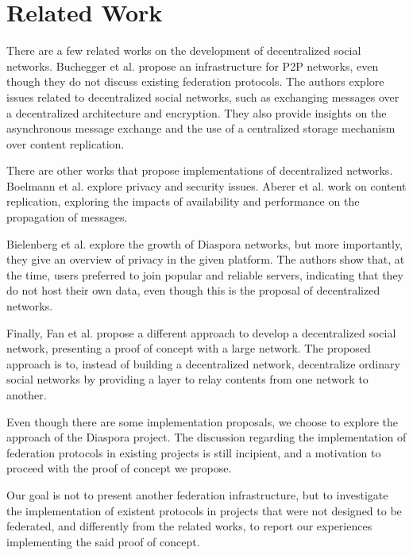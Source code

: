 \chapter{Related Work}
\label{chapter:3}

There are a few related works on the development of decentralized social
networks.
%
Buchegger et al. \cite{p2pInsights2009} propose an infrastructure for P2P
networks, even though they do not discuss existing federation protocols. The
authors explore issues related to decentralized social networks, such as
exchanging messages over a decentralized architecture and encryption.  They
also provide insights on the asynchronous message exchange and the use of a
centralized storage mechanism over content replication.

There are other works that propose implementations of decentralized networks.
Boelmann et al. \cite{sonet2013} explore privacy and security issues. Aberer et
al. \cite{my32012} work on content replication, exploring the impacts of
availability and performance on the propagation of messages.

Bielenberg et al. \cite{diasporaGrowth2012} explore the growth of Diaspora
networks, but more importantly, they give an overview of privacy in the given
platform. The authors show that, at the time, users preferred to join popular
and reliable servers, indicating that they do not host their own data, even
though this is the proposal of decentralized networks.

Finally, Fan et al. \cite{snsapi2014} propose a different approach to develop a
decentralized social network, presenting a proof of concept with a large
network. The proposed approach is to, instead of building a decentralized
network, decentralize ordinary social networks by providing a layer to relay
contents from one network to another.

Even though there are some implementation proposals, we choose to explore the
approach of the Diaspora project. The discussion regarding the implementation
of federation protocols in existing projects is still incipient, and a
motivation to proceed with the proof of concept we propose.

Our goal is not to present another federation infrastructure, but to
investigate the implementation of existent protocols in projects that were not
designed to be federated, and differently from the related works, to report our
experiences implementing the said proof of concept.
